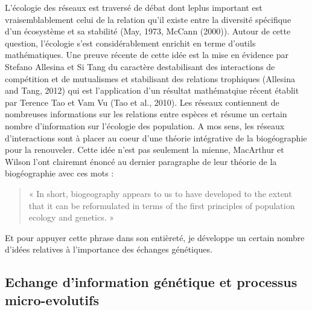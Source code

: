 L'écologie des réseaux est traversé de débat dont leplus important est
vraisemblablement celui de la relation qu'il existe entre la diversité
spécifique d'un écosystème et sa stabilité (May, 1973, McCann (2000)).
Autour de cette question, l'écologie s'est considérablement enrichit en
terme d'outils mathématiques. Une preuve récente de cette idée est la
mise en évidence par Stefano Allesina et Si Tang du caractère
destabilisant des interactions de compétition et de mutualismes et
stabilisant des relations trophiques (Allesina and Tang, 2012) qui est
l'application d'un résultat mathématqiue récent établit par Terence Tao
et Vam Vu (Tao et al., 2010). Les réseaux contiennent de nombreuses
informations sur les relations entre espèces et résume un certain nombre
d'information sur l'écologie des population. A mos sens, les réseaux
d'interactions sont à placer au coeur d'une théorie intégrative de la
biogéographie pour la renouveler. Cette idée n'est pas seulement la
mienne, MacArthur et Wilson l'ont clairemnt énoncé au dernier paragraphe
de leur théorie de la biogéographie avec ces mots :

\begin{quote}
« In short, biogeography appears to us to have developed to the extent
that it can be reformulated in terms of the first principles of
population ecology and genetics. »
\end{quote}

Et pour appuyer cette phrase dans son entièreté, je développe un certain
nombre d'idées relatives à l'importance des échanges génétiques.

\subsection*{Echange d'information génétique et processus
micro-evolutifs}\label{echange-dinformation-guxe9nuxe9tique-et-processus-micro-evolutifs}

